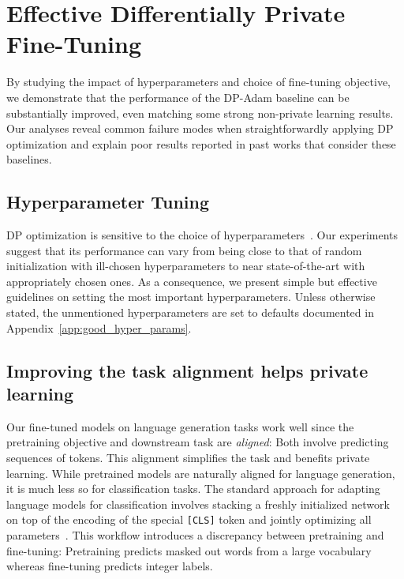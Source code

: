 \section{Effective Differentially Private Fine-Tuning}
By studying the impact of hyperparameters and choice of fine-tuning objective, we demonstrate that the performance of the DP-Adam baseline can be substantially improved, even matching some strong non-private learning results.
Our analyses reveal common failure modes when straightforwardly applying DP optimization and explain poor results reported in past works that consider these baselines.


\subsection{Hyperparameter Tuning}\label{sec:good_hyper_params}
DP optimization is sensitive to the choice of hyperparameters~\citep{papernot2019making}.
Our experiments suggest that its performance can vary from being close to that of random initialization with ill-chosen hyperparameters to near state-of-the-art with appropriately chosen ones. As a consequence, we present simple but effective guidelines on setting the most important hyperparameters.
Unless otherwise stated, the unmentioned hyperparameters are set to defaults documented in Appendix~\ref{app:good_hyper_params}. 




\subsection{Improving the task alignment helps private learning}\label{sec:task_alignment}
Our fine-tuned models on language generation tasks work well since the pretraining objective and downstream task are \emph{aligned}: Both involve predicting sequences of tokens.
This alignment simplifies the task and benefits private learning. 
While pretrained models are naturally aligned for language generation, it is much less so for classification tasks. The standard approach for adapting language models for classification involves stacking a freshly initialized network on top of the encoding of the special \texttt{[CLS]} token and jointly optimizing all parameters~\citep{devlin2018bert}. 
This workflow introduces a discrepancy between pretraining and fine-tuning: Pretraining predicts masked out words from a large vocabulary whereas fine-tuning predicts integer labels.

